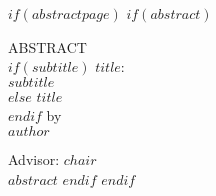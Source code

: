 \documentclass[$if(draft)$$draft$,$endif$$if(fontsize)$$fontsize$,$endif$$if(lang)$$babel-lang$,$endif$$if(papersize)$$papersize$,$endif$$if(sides)$$sides$,$endif$$for(classoption)$$classoption$$sep$,$endfor$]{$documentclass$}
\begin{document}
%
%
%

$if(abstractpage)$
$if(abstract)$
\clearpage{}
\label{chap:abstract}
\begin{center}%
  \singlespacing
  ABSTRACT \\[2em]
  $if(subtitle)$
  $title$:\\
  $subtitle$\\[1em]
  $else$
  $title$\\[1em]
  $endif$
  by \\[1em]
  $author$ \\[0.25in]
\end{center}
\vspace{0.25in}
\noindent Advisor: $chair$\\[1em]
\vspace{0.25in}
$abstract$
$endif$
$endif$
\end{document}
